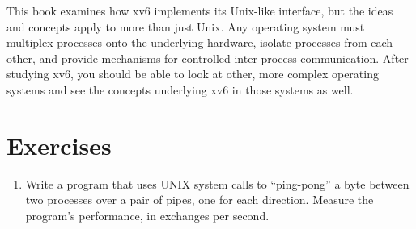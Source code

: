 This book examines how xv6 implements its Unix-like interface,
but the ideas and concepts apply to more than just Unix.
Any operating system must multiplex processes onto
the underlying hardware, isolate processes from each
other, and provide mechanisms for controlled
inter-process communication.
After studying xv6, you should be able to
look at other, more complex operating systems
and see the concepts underlying xv6 in those systems as well.

\section{Exercises}

\begin{enumerate}

\item Write a program that uses UNIX system calls to
``ping-pong'' a byte between two processes over a pair
of pipes, one for each direction. Measure the
program's performance, in exchanges per second.

\end{enumerate}
